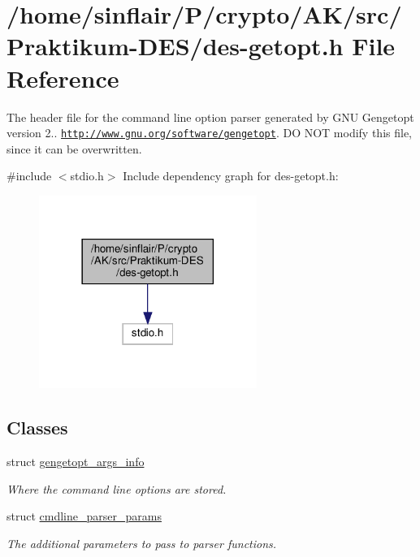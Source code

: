 \hypertarget{des-getopt_8h}{}\section{/home/sinflair/\+P/crypto/\+A\+K/src/\+Praktikum-\/\+D\+E\+S/des-\/getopt.h File Reference}
\label{des-getopt_8h}


The header file for the command line option parser generated by G\+NU Gengetopt version 2.. \href{http://www.gnu.org/software/gengetopt}{\tt http\+://www.\+gnu.\+org/software/gengetopt}. DO N\+OT modify this file, since it can be overwritten.  


{\ttfamily \#include $<$stdio.\+h$>$}\newline
Include dependency graph for des-\/getopt.h\+:
\nopagebreak
\begin{figure}[H]
\begin{center}
\leavevmode
\includegraphics[width=201pt]{des-getopt_8h__incl}
\end{center}
\end{figure}
\subsection*{Classes}
\begin{DoxyCompactItemize}
\item 
struct \hyperlink{structgengetopt__args__info}{gengetopt\+\_\+args\+\_\+info}
\begin{DoxyCompactList}\small\item\em Where the command line options are stored. \end{DoxyCompactList}\item 
struct \hyperlink{structcmdline__parser__params}{cmdline\+\_\+parser\+\_\+params}
\begin{DoxyCompactList}\small\item\em The additional parameters to pass to parser functions. \end{DoxyCompactList}\end{DoxyCompactItemize}

